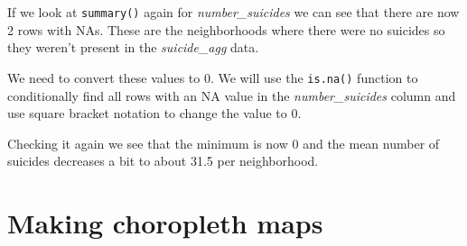 \documentclass[
]{krantz}
\makeatletter
\newenvironment{Shaded}{\begin{snugshade}}{\end{snugshade}}
\newcommand{\CommentTok}[1]{\textcolor[rgb]{0.37,0.37,0.37}{\textit{#1}}}
\newcommand{\DecValTok}[1]{\textcolor[rgb]{0.06,0.06,0.06}{#1}}
\newcommand{\FunctionTok}[1]{\textcolor[rgb]{0,0,0}{#1}}
\newcommand{\NormalTok}[1]{#1}
\newcommand{\OtherTok}[1]{\textcolor[rgb]{0.37,0.37,0.37}{#1}}
\newcommand{\SpecialCharTok}[1]{\textcolor[rgb]{0,0,0}{#1}}
\newenvironment{kframe}{%
\medskip{}
\setlength{\fboxsep}{.8em}
 \def\at@end@of@kframe{}%
 \ifinner\ifhmode%
  \def\at@end@of@kframe{\end{minipage}}%
  \begin{minipage}{\columnwidth}%
 \fi\fi%
 \def\FrameCommand##1{\hskip\@totalleftmargin \hskip-\fboxsep
 \colorbox{shadecolor}{##1}\hskip-\fboxsep
     \hskip-\linewidth \hskip-\@totalleftmargin \hskip\columnwidth}%
 \MakeFramed {\advance\hsize-\width
   \@totalleftmargin\z@ \linewidth\hsize
   \@setminipage}}%
 {\par\unskip\endMakeFramed%
 \at@end@of@kframe}
\renewenvironment{Shaded}{\begin{kframe}}{\end{kframe}}
\makeatother
\begin{document}
If we look at \texttt{summary()} again for \emph{number\_suicides} we can see that there are now 2 rows with NAs. These are the neighborhoods where there were no suicides so they weren't present in the \emph{suicide\_agg} data.

\begin{Shaded}
\end{Shaded}

We need to convert these values to 0. We will use the \texttt{is.na()} function to conditionally find all rows with an NA value in the \emph{number\_suicides} column and use square bracket notation to change the value to 0.

\begin{Shaded}
\end{Shaded}

Checking it again we see that the minimum is now 0 and the mean number of suicides decreases a bit to about 31.5 per neighborhood.

\begin{Shaded}
\end{Shaded}

\hypertarget{making-choropleth-maps}{%
\section{Making choropleth maps}\label{making-choropleth-maps}}
\end{document}
